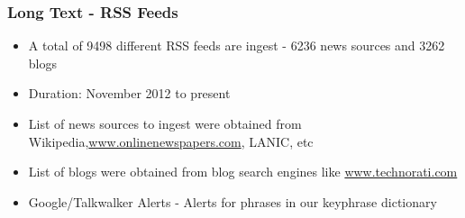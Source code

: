 \documentclass[red]{beamer}
\begin{document}
\begin{frame}
    \frametitle{Long Text - RSS Feeds}
    \begin{itemize}
        \item
            A total of 9498 different RSS feeds are ingest - 6236 news sources and 3262 blogs
        \item
            Duration: November 2012 to present
        \item
            List of news sources to ingest were obtained from Wikipedia,\url{www.onlinenewspapers.com}, LANIC, etc
        \item
            List of blogs were obtained from blog search engines like \url{www.technorati.com}
        \item
            Google/Talkwalker Alerts - Alerts for phrases in our keyphrase dictionary
    \end{itemize}
\end{frame}
\end{document}
